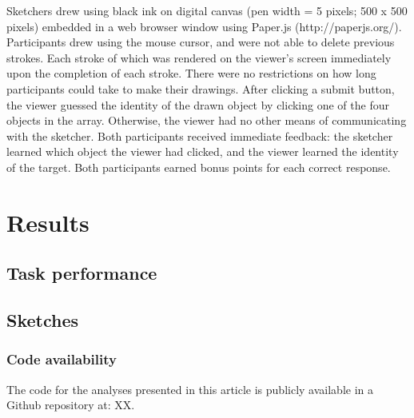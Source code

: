 \documentclass[manuscript]{stjour}
\begin{document}
Sketchers drew using black ink on digital canvas (pen width = 5 pixels; 500 x 500 pixels) embedded in a web browser window using Paper.js (http://paperjs.org/). Participants drew  using the mouse cursor, and were not able to delete previous strokes. Each stroke of which was rendered on the viewer's screen immediately upon the completion of each stroke. There were no restrictions on how long participants could take to make their drawings. After clicking a submit button, the viewer guessed the identity of the drawn object by clicking one of the four objects in the array. Otherwise, the viewer had no other means of communicating with the sketcher. Both participants received immediate feedback: the sketcher learned which object the viewer had clicked, and the viewer learned the identity of the target. Both participants earned bonus points for each correct response. 

\section*{Results}


\subsection*{Task performance}

\subsection*{Sketches}



\subsubsection*{Code availability} The code for the analyses presented in this article is publicly available in a Github repository at: XX.
\end{document}
